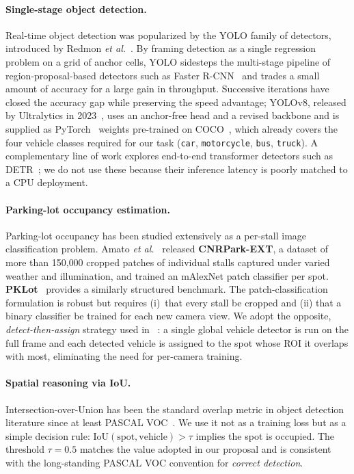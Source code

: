 \documentclass[10pt,twocolumn,letterpaper]{article}
\begin{document}
\paragraph{Single-stage object detection.}
Real-time object detection was popularized by the YOLO family of detectors,
introduced by Redmon \emph{et al.}~\cite{redmon2016yolo}. By framing
detection as a single regression problem on a grid of anchor cells, YOLO
sidesteps the multi-stage pipeline of region-proposal-based detectors such
as Faster R-CNN~\cite{ren2015faster} and trades a small amount of accuracy
for a large gain in throughput. Successive iterations have closed the
accuracy gap while preserving the speed advantage; YOLOv8, released by
Ultralytics in 2023~\cite{jocher2023yolov8}, uses an anchor-free head and a
revised backbone and is supplied as PyTorch~\cite{paszke2019pytorch} weights
pre-trained on COCO~\cite{lin2014coco}, which already covers the four
vehicle classes required for our task (\texttt{car}, \texttt{motorcycle},
\texttt{bus}, \texttt{truck}). A complementary line of work explores
end-to-end transformer detectors such as DETR~\cite{carion2020detr}; we do
not use these because their inference latency is poorly matched to a CPU
deployment.

\paragraph{Parking-lot occupancy estimation.}
Parking-lot occupancy has been studied extensively as a per-stall image
classification problem. Amato \emph{et al.}~\cite{amato2017deep} released
\textbf{CNRPark-EXT}, a dataset of more than 150{,}000 cropped patches of
individual stalls captured under varied weather and illumination, and
trained an mAlexNet patch classifier per spot. \textbf{PKLot}~\cite{pklot}
provides a similarly structured benchmark. The patch-classification
formulation is robust but requires (i)~that every stall be cropped and (ii)
that a binary classifier be trained for each new camera view. We adopt the
opposite, \emph{detect-then-assign} strategy used in
~\cite{acharya2018parking,nyambal2017automated}: a single global vehicle
detector is run on the full frame and each detected vehicle is assigned to
the spot whose ROI it overlaps with most, eliminating the need for
per-camera training.

\paragraph{Spatial reasoning via IoU.}
Intersection-over-Union has been the standard overlap metric in object
detection literature since at least PASCAL VOC~\cite{everingham2010pascal}.
We use it not as a training loss but as a simple decision rule:
$\mathrm{IoU}(\text{spot},\text{vehicle}) > \tau$ implies the spot is
occupied. The threshold $\tau{=}0.5$ matches the value adopted in our
proposal and is consistent with the long-standing PASCAL VOC convention for
\emph{correct detection}.
\end{document}
